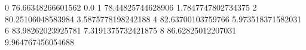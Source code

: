 0 76.66348266601562 0.0
1 78.44825744628906 1.7847747802734375
2 80.25106048583984 3.5875778198242188
4 82.63700103759766 5.973518371582031
6 83.98262023925781 7.3191375732421875
8 86.62825012207031 9.964767456054688

